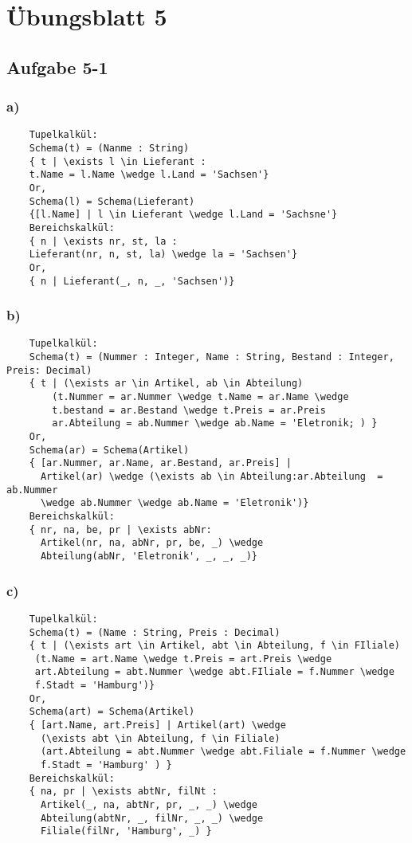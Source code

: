 \section{\"Ubungsblatt 5}
\subsection{Aufgabe 5-1}
\subsubsection{a)}
\begin{verbatim}
    Tupelkalkül:
    Schema(t) = (Nanme : String)
    { t | \exists l \in Lieferant : 
    t.Name = l.Name \wedge l.Land = 'Sachsen'}
    Or,
    Schema(l) = Schema(Lieferant)
    {[l.Name] | l \in Lieferant \wedge l.Land = 'Sachsne'} 
    Bereichskalkül:
    { n | \exists nr, st, la : 
    Lieferant(nr, n, st, la) \wedge la = 'Sachsen'}
    Or,
    { n | Lieferant(_, n, _, 'Sachsen')}
\end{verbatim}

\subsubsection{b)}
\begin{verbatim}
    Tupelkalkül:
    Schema(t) = (Nummer : Integer, Name : String, Bestand : Integer, Preis: Decimal)
    { t | (\exists ar \in Artikel, ab \in Abteilung)
        (t.Nummer = ar.Nummer \wedge t.Name = ar.Name \wedge
        t.bestand = ar.Bestand \wedge t.Preis = ar.Preis
        ar.Abteilung = ab.Nummer \wedge ab.Name = 'Eletronik; ) }
    Or,
    Schema(ar) = Schema(Artikel)
    { [ar.Nummer, ar.Name, ar.Bestand, ar.Preis] |
      Artikel(ar) \wedge (\exists ab \in Abteilung:ar.Abteilung  = ab.Nummer
      \wedge ab.Nummer \wedge ab.Name = 'Eletronik')}
    Bereichskalkül:
    { nr, na, be, pr | \exists abNr:
      Artikel(nr, na, abNr, pr, be, _) \wedge
      Abteilung(abNr, 'Eletronik', _, _, _)}
\end{verbatim}

\subsubsection{c)}
\begin{verbatim}
    Tupelkalkül:
    Schema(t) = (Name : String, Preis : Decimal)
    { t | (\exists art \in Artikel, abt \in Abteilung, f \in FIliale)
     (t.Name = art.Name \wedge t.Preis = art.Preis \wedge 
     art.Abteilung = abt.Nummer \wedge abt.FIliale = f.Nummer \wedge
     f.Stadt = 'Hamburg')}
    Or,
    Schema(art) = Schema(Artikel)
    { [art.Name, art.Preis] | Artikel(art) \wedge
      (\exists abt \in Abteilung, f \in Filiale)
      (art.Abteilung = abt.Nummer \wedge abt.Filiale = f.Nummer \wedge
      f.Stadt = 'Hamburg' ) }
    Bereichskalkül:
    { na, pr | \exists abtNr, filNt : 
      Artikel(_, na, abtNr, pr, _, _) \wedge
      Abteilung(abtNr, _, filNr, _, _) \wedge
      Filiale(filNr, 'Hamburg', _) }
\end{verbatim}

